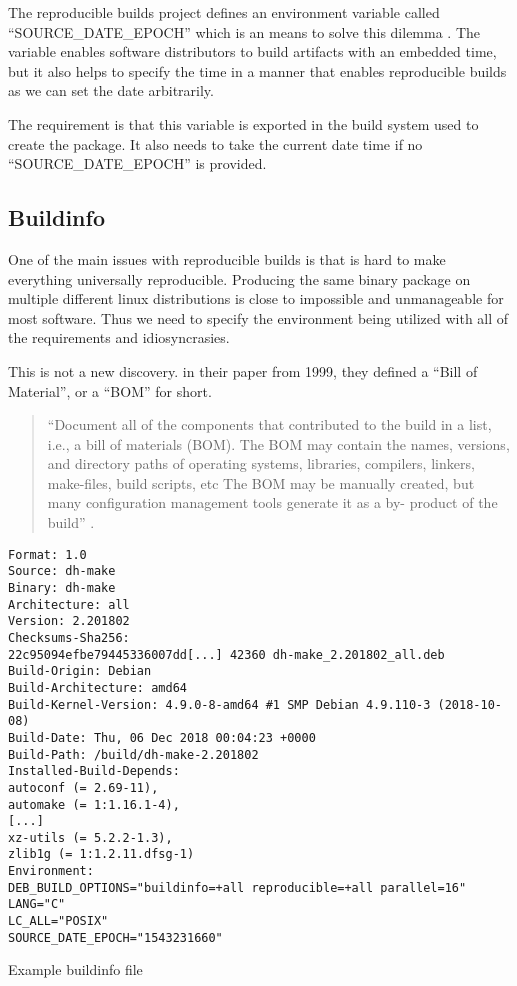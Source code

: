 \documentclass[../Main/thesis.tex]{subfiles}
\begin{document}
The reproducible builds project defines an environment variable called
``SOURCE\_DATE\_EPOCH'' which is an means to solve this dilemma
\cite{reproducible-builds-2019-source-date-epoch}. The variable enables software
distributors to build artifacts with an embedded time, but it also helps to
specify the time in a manner that enables reproducible builds as we can set the
date arbitrarily.

The requirement is that this variable is exported in the build system used to
create the package. It also needs to take the current date time if no
``SOURCE\_DATE\_EPOCH'' is provided.

\subsection*{Buildinfo}
One of the main issues with reproducible builds is that is hard to make
everything universally reproducible. Producing the same binary package on
multiple different linux distributions is close to impossible and unmanageable
for most software. Thus we need to specify the environment being utilized with
all of the requirements and idiosyncrasies.

This is not a new discovery.
\citeauthor{r.-torres-cabrera-and-bonnie-lee-appleton-1999} in their paper
 from 1999, they
defined a ``Bill of Material'', or a ``BOM'' for short.

\begin{quotation}
``Document all of the components that contributed to the build in a list, i.e.,
a bill of materials (BOM). The BOM may contain the names, versions, and
directory paths of operating systems, libraries, compilers, linkers, make-files,
build scripts, etc The BOM may be manually created, but many configuration
management tools generate it as a by- product of the build'' \cite{r.-torres-cabrera-and-bonnie-lee-appleton-1999}.
\end{quotation}

\begin{listing}[H]
\begin{verbatim}
Format: 1.0
Source: dh-make
Binary: dh-make
Architecture: all
Version: 2.201802
Checksums-Sha256:
22c95094efbe79445336007dd[...] 42360 dh-make_2.201802_all.deb
Build-Origin: Debian
Build-Architecture: amd64
Build-Kernel-Version: 4.9.0-8-amd64 #1 SMP Debian 4.9.110-3 (2018-10-08)
Build-Date: Thu, 06 Dec 2018 00:04:23 +0000
Build-Path: /build/dh-make-2.201802
Installed-Build-Depends:
autoconf (= 2.69-11),
automake (= 1:1.16.1-4),
[...]
xz-utils (= 5.2.2-1.3),
zlib1g (= 1:1.2.11.dfsg-1)
Environment:
DEB_BUILD_OPTIONS="buildinfo=+all reproducible=+all parallel=16"
LANG="C"
LC_ALL="POSIX"
SOURCE_DATE_EPOCH="1543231660"
\end{verbatim}
\caption{Example buildinfo file}
\label{lst:buildinfo}
\end{listing}
\end{document}
